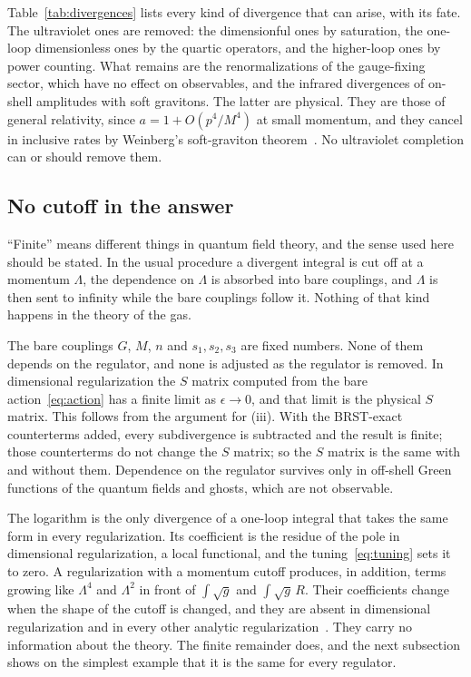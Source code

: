\documentclass[aps,prd,10pt,twocolumn,superscriptaddress,nofootinbib,floatfix,longbibliography]{revtex4-2}
\begin{document}
Table~\ref{tab:divergences} lists every kind of divergence that can arise, with its fate. The ultraviolet ones are removed: the dimensionful ones by saturation, the one-loop dimensionless ones by the quartic operators, and the higher-loop ones by power counting. What remains are the renormalizations of the gauge-fixing sector, which have no effect on observables, and the infrared divergences of on-shell amplitudes with soft gravitons. The latter are physical. They are those of general relativity, since $a=1+O(p^4/M^4)$ at small momentum, and they cancel in inclusive rates by Weinberg's soft-graviton theorem~\cite{Weinberg1965}. No ultraviolet completion can or should remove them.

\subsection{No cutoff in the answer}
\label{sec:nocutoff}

``Finite'' means different things in quantum field theory, and the sense used here should be stated. In the usual procedure a divergent integral is cut off at a momentum $\Lambda$, the dependence on $\Lambda$ is absorbed into bare couplings, and $\Lambda$ is then sent to infinity while the bare couplings follow it. Nothing of that kind happens in the theory of the gas.

The bare couplings $G$, $M$, $n$ and $s_1,s_2,s_3$ are fixed numbers. None of them depends on the regulator, and none is adjusted as the regulator is removed. In dimensional regularization the $S$ matrix computed from the bare action~\eqref{eq:action} has a finite limit as $\epsilon\to0$, and that limit is the physical $S$ matrix. This follows from the argument for (iii). With the BRST-exact counterterms added, every subdivergence is subtracted and the result is finite; those counterterms do not change the $S$ matrix; so the $S$ matrix is the same with and without them. Dependence on the regulator survives only in off-shell Green functions of the quantum fields and ghosts, which are not observable.

The logarithm is the only divergence of a one-loop integral that takes the same form in every regularization. Its coefficient is the residue of the pole in dimensional regularization, a local functional, and the tuning~\eqref{eq:tuning} sets it to zero. A regularization with a momentum cutoff produces, in addition, terms growing like $\Lambda^4$ and $\Lambda^2$ in front of $\int\sqrt g$ and $\int\sqrt g\,R$. Their coefficients change when the shape of the cutoff is changed, and they are absent in dimensional regularization and in every other analytic regularization~\cite{Collins1984}. They carry no information about the theory. The finite remainder does, and the next subsection shows on the simplest example that it is the same for every regulator.
\end{document}
